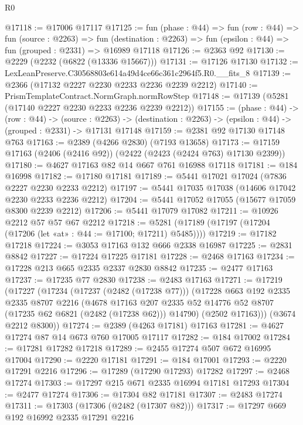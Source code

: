 \begin{lexlean}{R0}
\begin{coremodule}
@17118 := @17006 @17117
@17125 := fun (phase : @44) =>
  fun (row : @44) =>
  fun (source : @2263) =>
  fun (destination : @2263) => fun (epsilon : @44) => fun (grouped : @2331) => @16989 @17118
@17126 := @2363 @92
@17130 := @2229 (@2232 (@6822 (@13336 @15667)))
@17131 := @17126 @17130
@17132 := LexLeanPreserve.C30568803e614a49d4ce66c361c2964f5.R0.__fits_8
@17139 := @2366 (@17132 @2227 @2230 @2233 @2236 @2239 @2212)
@17140 := PrismTemplateContract.NormGraph.normRowStep
@17148 := @17139 (@5281 (@17140 @2227 @2230 @2233 @2236 @2239 @2212))
@17155 := (phase : @44) ->
  (row : @44) ->
  (source : @2263) -> (destination : @2263) -> (epsilon : @44) -> (grouped : @2331) -> @17131 @17148
@17159 := @2381 @92 @17130 @17148 @763
@17163 := @2389 (@4266 @2830) (@7193 @13658)
@17173 := @17159 @17163 (@2406 (@2416 @92)) (@2422 (@2423 (@2424 @763) @17130 @2399))
@17180 := @4627 @17163 @82 @14 @667 @761 @16988 @17118
@17181 := @184 @16998
@17182 := @17180 @17181
@17189 := @5441 @17021 @17024 (@7836 @2227 @2230 @2233 @2212)
@17197 := @5441 @17035 @17038 (@14606 @17042 @2230 @2233 @2236 @2212)
@17204 := @5441 @17052 @17055 (@15677 @17059 @8300 @2239 @2212)
@17206 := @5441 @17079 @17082
@17211 := @10926 @2212 @57 @57 @67 @2212
@17218 := @5281 (@17189 (@17197 (@17204 (@17206 (let «at» : @44 := @17100; @17211) @5485))))
@17219 := @17182 @17218
@17224 := @3053 @17163 @132 @666 @2338 @16987
@17225 := @2831 @8842
@17227 := @17224 @17225 @17181
@17228 := @2468 @17163
@17234 := @17228 @213 @665 @2335 @2337 @2830 @8842
@17235 := @2477 @17163
@17237 := @17235 @77 @2830
@17238 := @2483 @17163
@17271 := @17219
    (@17227
      (@17234
        (@17237 (@2482 (@17238 @77)))
        (@17228
          @663
          @192
          @2335
          @2335
          @8707
          @2216
          (@4678
            @17163
            @207
            @2335
            @52
            @14776
            @52
            @8707
            (@17235 @62 @6821 (@2482 (@17238 @62)))
            @14790)
          (@2502 @17163)))
      (@3674 @2212 @8300))
@17274 := @2389 (@4263 @17181) @17163
@17281 := @4627 @17274 @87 @14 @673 @760 @17005 @17117
@17282 := @184 @17002
@17284 := @17281 @17282 @17218
@17289 := @2455 @17274 @507 @672 @16995 @17004
@17290 := @2220 @17181
@17291 := @184 @17001
@17293 := @2220 @17291 @2216
@17296 := @17289 (@17290 @17293) @17282
@17297 := @2468 @17274
@17303 := @17297 @215 @671 @2335 @16994 @17181 @17293
@17304 := @2477 @17274
@17306 := @17304 @82 @17181
@17307 := @2483 @17274
@17311 := @17303 (@17306 (@2482 (@17307 @82)))
@17317 := @17297 @669 @192 @16992 @2335 @17291 @2216

\end{coremodule}
\end{lexlean}
